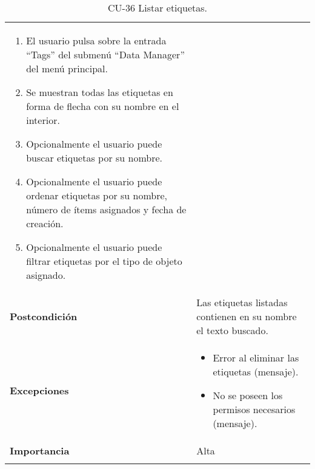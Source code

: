 \begin{longtable}[]{@{}ll@{}}
\begin{minipage}[t]{0.77\columnwidth}
\begin{enumerate}
\def\labelenumi{\arabic{enumi}.}
\tightlist
\item
  El usuario pulsa sobre la entrada ``Tags'' del submenú ``Data Manager''
  del menú principal.
\item
  Se muestran todas las etiquetas en forma de flecha con su nombre en el
  interior.
\item
  Opcionalmente el usuario puede buscar etiquetas por su nombre.
\item
  Opcionalmente el usuario puede ordenar etiquetas por su nombre, número
  de ítems asignados y fecha de creación.
\item
  Opcionalmente el usuario puede filtrar etiquetas por el tipo de objeto
  asignado.
\end{enumerate}\strut
\end{minipage}\tabularnewline
\begin{minipage}[t]{0.17\columnwidth}\raggedright
\textbf{Postcondición}\strut
\end{minipage} & \begin{minipage}[t]{0.77\columnwidth}\raggedright
Las etiquetas listadas contienen en su nombre el texto buscado.\strut
\end{minipage}\tabularnewline
\begin{minipage}[t]{0.17\columnwidth}\raggedright
\textbf{Excepciones}\strut
\end{minipage} & \begin{minipage}[t]{0.77\columnwidth}\raggedright
\begin{itemize}
\tightlist
\item
  Error al eliminar las etiquetas (mensaje).
\item
  No se poseen los permisos necesarios (mensaje).
\end{itemize}\strut
\end{minipage}\tabularnewline
\begin{minipage}[t]{0.17\columnwidth}\raggedright
\textbf{Importancia}\strut
\end{minipage} & \begin{minipage}[t]{0.77\columnwidth}\raggedright
Alta\strut
\end{minipage}\tabularnewline
\bottomrule
\caption{CU-36 Listar etiquetas.}
\end{longtable}

